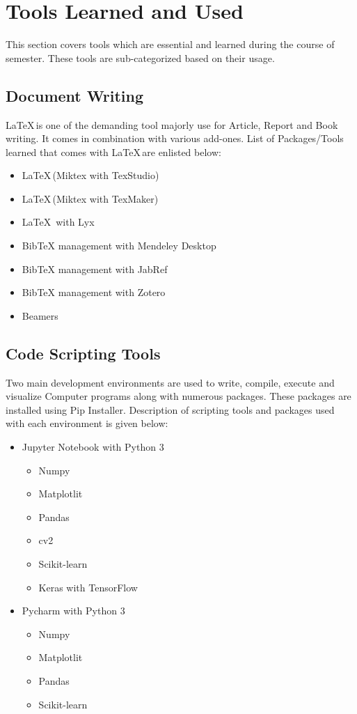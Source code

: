 \documentclass[12pt,a4paper,titlepage]{report}
\begin{document}
\section{Tools Learned and Used}
This section covers tools which are essential and learned during the course of semester. These tools are sub-categorized based on their usage.

\subsection{Document Writing}
\LaTeX \,is one of the demanding tool majorly use for Article, Report and Book writing. It comes in combination with various add-ones. List of Packages/Tools learned that comes with \LaTeX \,are enlisted below:

\begin{itemize}
\item \LaTeX \,(Miktex with TexStudio)
\item \LaTeX \,(Miktex with TexMaker)
\item \LaTeX \, with Lyx 
\item BibTeX management with Mendeley Desktop  
\item BibTeX management with JabRef
\item BibTeX management with Zotero
\item Beamers 
\end{itemize}

\subsection{Code Scripting Tools}
Two main development environments are used to write, compile, execute and visualize Computer programs along with numerous packages. These packages are installed using Pip Installer. Description of scripting tools and packages used with each environment is given below: 

\begin{itemize}
\item Jupyter Notebook with Python 3
 \begin{itemize}
 \item Numpy
 \item Matplotlit
 \item Pandas
 \item cv2
 \item Scikit-learn
 \item Keras with TensorFlow
 \end{itemize}
\item Pycharm with Python 3 
 \begin{itemize}
 \item Numpy
 \item Matplotlit
 \item Pandas
 \item Scikit-learn
 \end{itemize}
\end{itemize}
\end{document}

